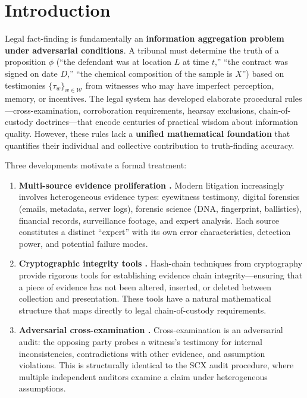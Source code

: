 \documentclass[11pt,a4paper]{article}
\theoremstyle{definition}
\newcommand{\SCX}{\textsc{SCX}}
\newcommand{\witnessSet}{\mathcal{W}}           %
\newcommand{\fact}{\phi}                        %
\begin{document}
\section{Introduction }

Legal fact-finding is fundamentally an \textbf{information aggregation problem under adversarial conditions}. A tribunal must determine the truth of a proposition $\fact$ (``the defendant was at location $L$ at time $t$,'' ``the contract was signed on date $D$,'' ``the chemical composition of the sample is $X$'') based on testimonies $\{\tau_w\}_{w \in \witnessSet}$ from witnesses who may have imperfect perception, memory, or incentives. The legal system has developed elaborate procedural rules---cross-examination, corroboration requirements, hearsay exclusions, chain-of-custody doctrines---that encode centuries of practical wisdom about information quality. However, these rules lack a \textbf{unified mathematical foundation} that quantifies their individual and collective contribution to truth-finding accuracy.

Three developments motivate a formal treatment:

\begin{enumerate}[label=(\roman*)]
    \item \textbf{Multi-source evidence proliferation .} Modern litigation increasingly involves heterogeneous evidence types: eyewitness testimony, digital forensics (emails, metadata, server logs), forensic science (DNA, fingerprint, ballistics), financial records, surveillance footage, and expert analysis. Each source constitutes a distinct ``expert'' with its own error characteristics, detection power, and potential failure modes.
    \item \textbf{Cryptographic integrity tools .} Hash-chain techniques from cryptography provide rigorous tools for establishing evidence chain integrity---ensuring that a piece of evidence has not been altered, inserted, or deleted between collection and presentation. These tools have a natural mathematical structure that maps directly to legal chain-of-custody requirements.
    \item \textbf{Adversarial cross-examination .} Cross-examination is an adversarial audit: the opposing party probes a witness's testimony for internal inconsistencies, contradictions with other evidence, and assumption violations. This is structurally identical to the \SCX{} audit procedure, where multiple independent auditors examine a claim under heterogeneous assumptions.
\end{enumerate}
\end{document}
